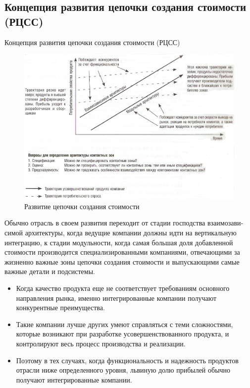 \documentclass[_Venture_p3.tex]{subfiles}
\begin{document}
\subsection{Концепция развития цепочки создания стоимости (РЦСС)}
\begin{frame}{Концепция развития цепочки создания стоимости (РЦСС)}
\begin{figure}
	\centering
	\includegraphics[scale=.4]{img/value_chain_development}
	\caption{Развитие цепочки создания стоимости }
\end{figure}
\end{frame}


\begin{frame}
Обычно отрасль в своем развития переходит от стадии господства взаимозави­симой архитектуры, когда ведущие компании должны идти на вертикальную интеграцию, к стадии модульности, когда самая большая доля добавленной стоимости производится специализированными компаниями, отвечающими за жизненно важные зоны цепочки создания стоимости и выпускающими самые важные детали и подсистемы.
\end{frame}

\begin{frame}
\begin{itemize}
	\small
	\item Когда качество продукта еще не соответствует требованиям основного направления рынка, именно интегрированные компании получают конкурентные преимущества. 
	\item Такие компании лучше других умеют справляться с теми сложностями, которые возникают при разработке усовершенствованного продукта, и контролируют весь процесс производства и реализации. 
	\item Поэтому в тех случаях, когда функциональность и надежность продуктов отрасли ниже определенного уровня, львиную долю прибылей обычно получают интегрированные компании.
\end{itemize}
\end{frame}
\end{document}
